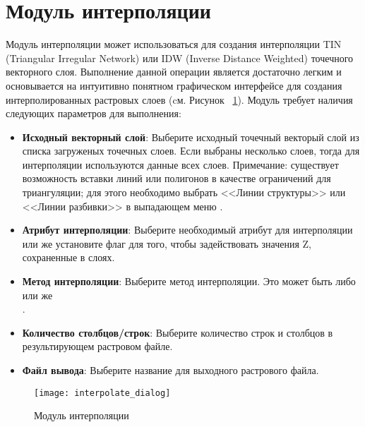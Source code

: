 
\section{Модуль интерполяции}


Модуль интерполяции может использоваться для создания интерполяции TIN
(Triangular Irregular Network) или IDW (Inverse Distance Weighted)
точечного векторного слоя. Выполнение данной операции является
достаточно легким и основывается на интуитивно понятном графическом
интерфейсе для создания интерполированных растровых слоев (cм. Рисунок~
\ref{fig:interpolation_dialog}). Модуль требует наличия следующих
параметров для выполнения:

\begin{itemize}[label=--]
\item \textbf{Исходный векторный слой}: Выберите исходный точечный
векторый слой из списка загруженых точечных слоев. Если выбраны
несколько слоев, тогда для интерполяции используются данные всех слоев.
Примечание: существует возможность вставки линий или полигонов в
качестве ограничений для триангуляции; для этого необходимо выбрать
<<Линии структуры>> или <<Линии разбивки>> в выпадающем меню
.
\item \textbf{Атрибут интерполяции}: Выберите необходимый атрибут
для интерполяции или же установите флаг
 для того, чтобы
задействовать значения Z, сохраненные в слоях.
\item \textbf{Метод интерполяции}: Выберите метод интерполяции. Это
может быть либо \\
 или же \\
.
\item \textbf{Количество столбцов/строк}: Выберите количество строк и
столбцов в результирующем растровом файле.
\item \textbf{Файл вывода}: Выберите название для выходного растрового
файла.
\end{itemize}

\begin{figure}[ht]
   \centering
   \texttt{[image: interpolate\_dialog]}
   \caption{Модуль интерполяции \nixcaption}\label{fig:interpolation_dialog}
\end{figure}

